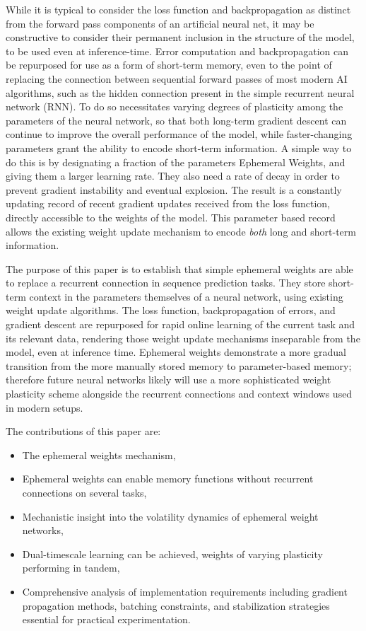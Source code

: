 \documentclass[conference]{IEEEtran}
\begin{document}
While it is typical to consider the loss function and backpropagation as distinct from the forward pass components of an artificial neural net, it may be constructive to consider their permanent inclusion in the structure of the model, to be used even at inference-time. Error computation and backpropagation can be repurposed for use as a form of short-term memory, even to the point of replacing the connection between sequential forward passes of most modern AI algorithms, such as the hidden connection present in the simple recurrent neural network (RNN). To do so necessitates varying degrees of plasticity among the parameters of the neural network, so that both long-term gradient descent can continue to improve the overall performance of the model, while faster-changing parameters grant the ability to encode short-term information. A simple way to do this is by designating a fraction of the parameters Ephemeral Weights, and giving them a larger learning rate. They also need a rate of decay in order to prevent gradient instability and eventual explosion. The result is a constantly updating record of recent gradient updates received from the loss function, directly accessible to the weights of the model. This parameter based record allows the existing weight update mechanism to encode \emph{both} long and short-term information.

The purpose of this paper is to establish that simple ephemeral weights are able to replace a recurrent connection in sequence prediction tasks. They store short-term context in the parameters themselves of a neural network, using existing weight update algorithms. The loss function, backpropagation of errors, and gradient descent are repurposed for rapid online learning of the current task and its relevant data, rendering those weight update mechanisms inseparable from the model, even at inference time. Ephemeral weights demonstrate a more gradual transition from the more manually stored memory to parameter-based memory; therefore future neural networks likely will use a more sophisticated weight plasticity scheme alongside the recurrent connections and context windows used in modern setups. 

The contributions of this paper are: 
\begin{itemize}
\item The ephemeral weights mechanism,
\item Ephemeral weights can enable memory functions without recurrent connections on several tasks, 
\item Mechanistic insight into the volatility dynamics of ephemeral weight networks, 
\item Dual-timescale learning can be achieved, weights of varying plasticity performing in tandem, 
\item Comprehensive analysis of implementation requirements including gradient propagation methods, batching constraints, and stabilization strategies essential for practical experimentation.
\end{itemize}
\end{document}
